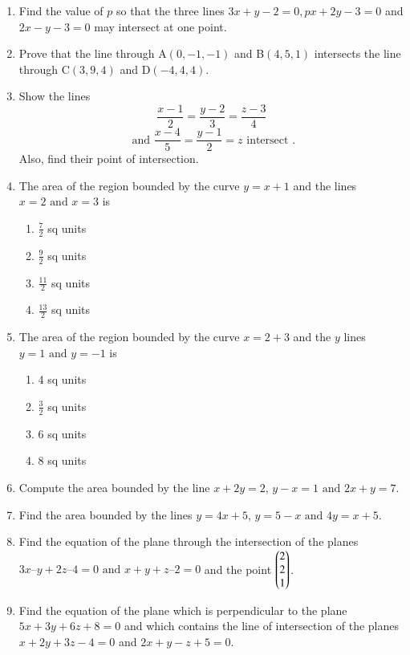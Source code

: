 \begin{enumerate}[label=\thesubsection.\arabic*,ref=\thesubsection.\theenumi]
\item
Find the value of $p$ so that the three lines $3x+y-2=0,px+2y-3=0$ and $2x-y-3=0$ may intersect at one point.
\label{11.10.4.9}
\\
\solution

\item Prove that the line through A$(0,-1,-1)$ and B$(4,5,1)$ intersects the line through C$(3,9,4)$ and D$(-4,4,4)$.
\item Show the lines
$$\frac{x-1}{2}=\frac{y-2}{3}=\frac{z-3}{4}$$
$$\text{ and } \frac{x-4}{5}=\frac{y-1}{2}=z  \text{ intersect }.$$
 Also, find their point of intersection.
\item The area of the region bounded by the curve $y = x + 1$ and the lines $x = 2\text{ and }x = 3$ is
\begin{enumerate}
\item $\frac{7}{2}$ sq units
\item $\frac{9}{2}$ sq units
\item $\frac{11}{2}$ sq units
\item $\frac{13}{2}$ sq units
\end{enumerate}   
\item The area of the region bounded by the curve $x = 2 + 3$ and the $y$ lines $y = 1\text{ and }y = - 1$ is
\begin{enumerate}
\item 4 sq units 
\item $\frac{3}{2}$ sq units
\item 6 sq units
\item 8 sq units
\end{enumerate}
\item Compute the area bounded by the line $x + 2y = 2$, $y - x = 1\text{ and }2x + y = 7$.
\item Find the area bounded by the lines $y = 4x + 5$, $y = 5 - x\text{ and }4y = x + 5$.
	\item  Find the equation of the plane through the intersection of the planes $3{x} – {y} + 2{z} – 4 = 0 \text{ and } {x} + {y} + {z} – 2 = 0$ and the point $\begin{pmatrix}2\\2\\1\end{pmatrix}$.
		\label{prob:12/11/3/9/plane}
		\\
    \solution
		
\item Find the equation of the plane which is perpendicular to the plane $5x+3y+6z+8=0$ and which contains the line of intersection of the planes $x+2y+3z-4=0$ and $2x+y-z+5=0.$

\end{enumerate}
